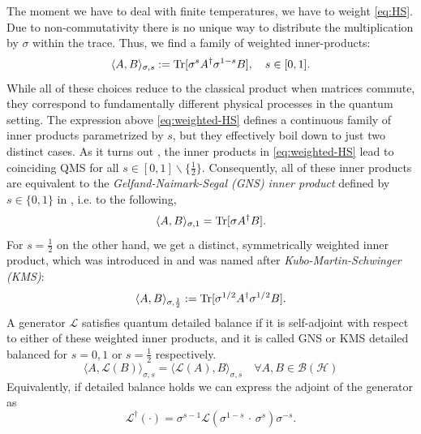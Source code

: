 The moment we have to deal with finite temperatures, we have to weight \eqref{eq:HS}. Due to non-commutativity there is no unique way to distribute the multiplication by $\sigma$ within the trace. Thus, we find a family of weighted inner-products:
\begin{equation}
    \label{eq:weighted-HS}
    \langle A, B \rangle_{\sigma, s} := \operatorname{Tr}[\sigma^s A^\dagger \sigma^{1-s} B], \quad s\in[0,1].
\end{equation}
While all of these choices reduce to the classical product when matrices commute, they correspond to fundamentally different physical processes in the quantum setting.
The expression above \eqref{eq:weighted-HS} defines a continuous family of inner products parametrized by $s$, but they effectively boil down to just two distinct cases. As it turns out \cite{fagnola2007generators}, the inner products in \eqref{eq:weighted-HS} lead to coinciding QMS for all $s\in[0,1] \backslash \{\frac{1}{2}\}$. Consequently, all of these inner products are equivalent to the \textit{Gelfand-Naimark-Segal (GNS) inner product} defined by $s\in\{0, 1\}$ in \cite{alicki1976detailed}, i.e. to the following,
\begin{equation}
    \label{eq:GNS-product}
    \langle A, B\rangle_{\sigma, 1} = \operatorname{Tr}[\sigma A^\dagger B].
\end{equation}
For $s=\frac{1}{2}$ on the other hand, we get a distinct, symmetrically weighted inner product, which was introduced in \cite{goldstein1995kms} and was named after \textit{Kubo-Martin-Schwinger (KMS)}:
\begin{equation}
\langle A, B \rangle_{\sigma, \frac{1}{2}} := \operatorname{Tr}[\sigma^{1/2} A^\dagger \sigma^{1/2} B].
\end{equation}
A generator $\mathcal{L}$ satisfies quantum detailed balance if it is self-adjoint with respect to either of these weighted inner products, and it is called GNS or KMS detailed balanced for $s = 0, 1$ or $s=\frac{1}{2}$ respectively.
\begin{equation}
    \langle A, \mathcal{L}(B) \rangle_{\sigma, s} = \langle \mathcal{L}(A), B \rangle_{\sigma, s} \quad\forall A, B \in \mathcal{B(H)}
\end{equation}
Equivalently, if detailed balance holds we can express the adjoint of the generator as
\begin{equation}
    \label{eq:general-qdb-adjoint}
    \mathcal{L^\dagger}(\cdot) = \sigma^{s-1} \mathcal{L}(\sigma^{1-s}\, \cdot\, \sigma^{s}) \sigma^{-s}.
\end{equation}
